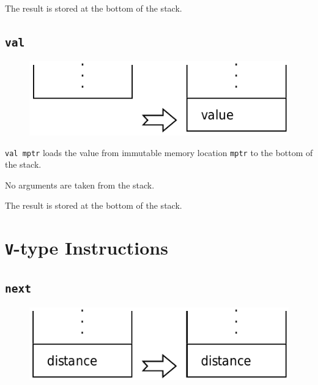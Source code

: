 			The result is stored at the bottom of the stack.
	
	\qquad

	\subsection*{\texttt{val}}
	
		\begin{figure}
			\begin{flushright}
				\includegraphics[width=\linewidth]{figure/pdf/i_rtype} 
			\end{flushright}
		\end{figure}
	
			\texttt{val mptr} loads the value from immutable memory location 
			\texttt{mptr} to the bottom of the stack.
			
			No arguments are taken from the stack.
			
			The result is stored at the bottom of the stack.
	
	\qquad

\section{\texttt{V}-type Instructions}

	\subsection*{\texttt{next}}
	
		\begin{figure}
			\begin{flushright}
				\includegraphics[width=\linewidth]{figure/pdf/i_next} 
			\end{flushright}
		\end{figure}
	

